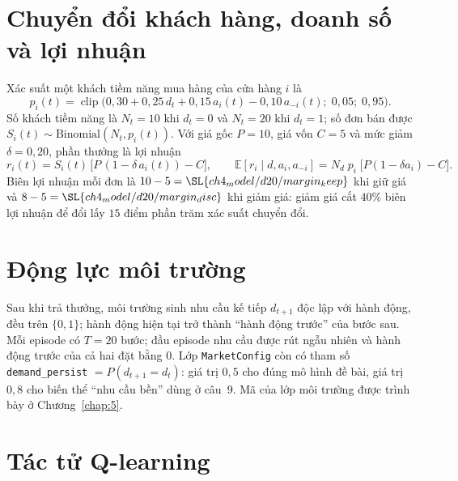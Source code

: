 \section{Chuyển đổi khách hàng, doanh số và lợi nhuận}

Xác suất một khách tiềm năng mua hàng của cửa hàng $i$ là
\begin{equation}\label{eq:conv}
  p_i(t) = \operatorname{clip}\bigl(0{,}30 + 0{,}25\,d_t + 0{,}15\,a_i(t) - 0{,}10\,a_{-i}(t);\; 0{,}05;\; 0{,}95\bigr).
\end{equation}
Số khách tiềm năng là $N_t = 10$ khi $d_t = 0$ và $N_t = 20$ khi $d_t=1$; số đơn bán được
$S_i(t)\sim\mathrm{Binomial}(N_t, p_i(t))$. Với giá gốc $P=10$, giá vốn $C=5$ và mức giảm $\delta=0{,}20$, phần thưởng là
lợi nhuận
\begin{equation}\label{eq:reward}
  r_i(t) = S_i(t)\,\bigl[P\,(1-\delta\,a_i(t)) - C\bigr],
  \qquad \mathbb E[r_i\mid d,a_i,a_{-i}] = N_d\; p_i\; \bigl[P(1-\delta a_i)-C\bigr].
\end{equation}
Biên lợi nhuận mỗi đơn là $10-5=\SL{ch4_model/d20/margin_keep}$ khi giữ giá và $8-5=\SL{ch4_model/d20/margin_disc}$
khi giảm giá: giảm giá cắt $40\%$ biên lợi nhuận để đổi lấy $15$ điểm phần trăm xác suất chuyển đổi.


\section{Động lực môi trường}

Sau khi trả thưởng, môi trường sinh nhu cầu kế tiếp $d_{t+1}$ độc lập với hành động, đều trên $\{0,1\}$; hành động
hiện tại trở thành ``hành động trước'' của bước sau. Mỗi episode có $T=20$ bước; đầu episode nhu cầu được rút
ngẫu nhiên và hành động trước của cả hai đặt bằng $0$. Lớp \texttt{MarketConfig} còn có tham số
\texttt{demand\_persist} $=P(d_{t+1}=d_t)$: giá trị $0{,}5$ cho đúng mô hình đề bài, giá trị $0{,}8$ cho biến thể
``nhu cầu bền'' dùng ở câu~9. Mã của lớp môi trường được trình bày ở Chương~\ref{chap:5}.

\section{Tác tử Q-learning}

